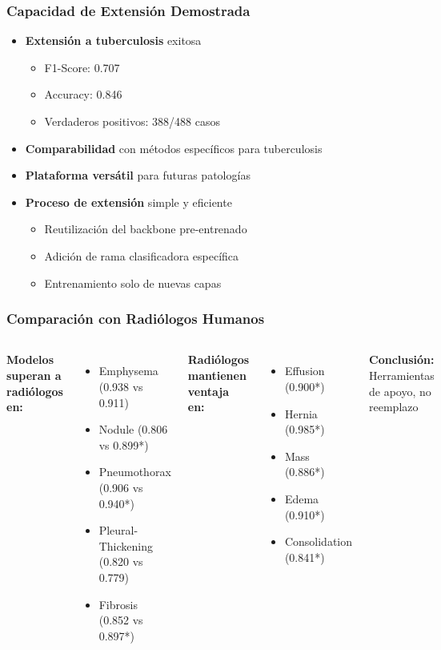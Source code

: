 \begin{frame}
\frametitle{Capacidad de Extensión Demostrada}
\begin{itemize}
    \item \textbf{Extensión a tuberculosis} exitosa
    \begin{itemize}
        \item F1-Score: 0.707
        \item Accuracy: 0.846
        \item Verdaderos positivos: 388/488 casos
    \end{itemize}
    \item \textbf{Comparabilidad} con métodos específicos para tuberculosis
    \item \textbf{Plataforma versátil} para futuras patologías
    \item \textbf{Proceso de extensión} simple y eficiente
    \begin{itemize}
        \item Reutilización del backbone pre-entrenado
        \item Adición de rama clasificadora específica
        \item Entrenamiento solo de nuevas capas
    \end{itemize}
\end{itemize}
\end{frame}

\begin{frame}
\frametitle{Comparación con Radiólogos Humanos}
\begin{columns}
\textbf{Modelos superan a radiólogos en:}
\begin{itemize}
    \item Emphysema (0.938 vs 0.911)
    \item Nodule (0.806 vs 0.899*)
    \item Pneumothorax (0.906 vs 0.940*)
    \item Pleural-Thickening (0.820 vs 0.779)
    \item Fibrosis (0.852 vs 0.897*)
\end{itemize}

\textbf{Radiólogos mantienen ventaja en:}
\begin{itemize}
    \item Effusion (0.900*)
    \item Hernia (0.985*)
    \item Mass (0.886*)
    \item Edema (0.910*)
    \item Consolidation (0.841*)
\end{itemize}

\textbf{Conclusión:} Herramientas de apoyo, no reemplazo
\end{columns}
\end{frame}

